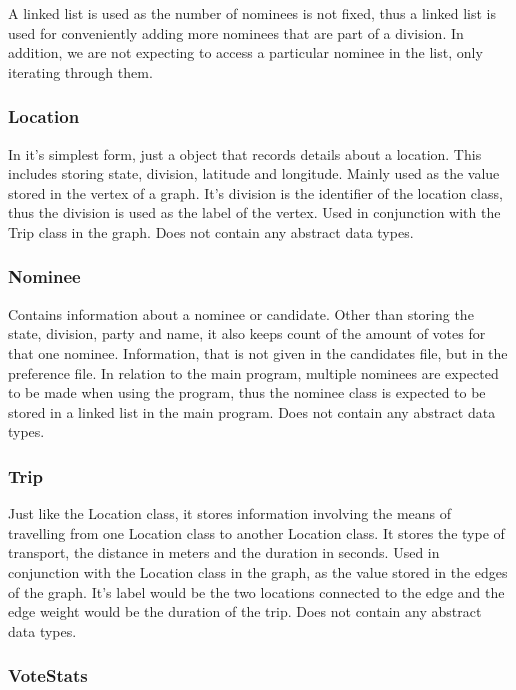 \documentclass[a4paper, 12pt, titlepage]{article}
\begin{document}
A linked list is used as the number of nominees is not fixed, thus a linked
list is used for conveniently adding more nominees that are part of a division.
In addition, we are not expecting to access a particular nominee in the list,
only iterating through them.

\subsubsection{Location}

In it's simplest form, just a object that records details about a location.
This includes storing state, division, latitude and longitude. Mainly used
as the value stored in the vertex of a graph. It's division is the identifier
of the location class, thus the division is used as the label of the vertex.
Used in conjunction with the Trip class in the graph. Does not contain any
abstract data types.

\subsubsection{Nominee}

Contains information about a nominee or candidate. Other than storing the
state, division, party and name, it also keeps count of the amount of votes
for that one nominee. Information, that is not given in the candidates file,
but in the preference file. In relation to the main program, multiple nominees
are expected to be made when using the program, thus the nominee class is
expected to be stored in a linked list in the main program. Does not contain
any abstract data types.

\subsubsection{Trip}

Just like the Location class, it stores information involving the means of
travelling from one Location class to another Location class. It stores
the type of transport, the distance in meters and the duration in seconds.
Used in conjunction with the Location class in the graph, as the value
stored in the edges of the graph. It's label would be the two locations
connected to the edge and the edge weight would be the duration of the trip.
Does not contain any abstract data types.

\subsubsection{VoteStats}
\end{document}
